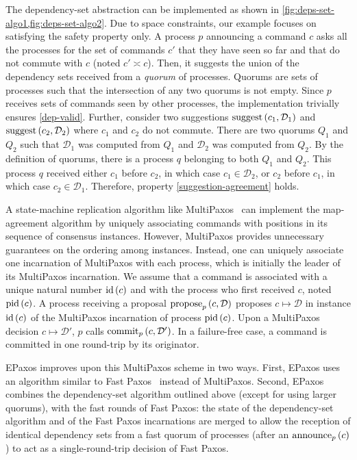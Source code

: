 The dependency-set abstraction can be implemented as shown in \cref{fig:deps-set-algo1,fig:deps-set-algo2}. Due to space constraints, our example focuses on satisfying the safety property only. A process $p$ announcing a command $c$ asks all the processes for the set of commands $c'$ that they have seen so far and that do not commute with $c$ (noted $c' \asymp c$). Then, it suggests the union of the dependency sets received from a \emph{quorum} of processes. Quorums are sets of processes such that the intersection of any two
quorums is not empty. Since $p$ receives sets of commands seen by other processes, the implementation trivially ensures \ref{dep-valid}. 
Further, consider two suggestions $\operatorname{suggest}\left(c_1,\mathcal{D}_1\right)$ and $\operatorname{suggest}\left(c_2,\mathcal{D}_2\right)$ where $c_1$ and $c_2$ do not commute. There are two quorums $Q_1$ and $Q_2$ such that $\mathcal{D}_1$ was computed from $Q_1$ and $\mathcal{D}_2$ was computed from $Q_2$. By the definition of quorums, there is a process $q$ belonging to both $Q_1$ and $Q_2$. This process $q$ received either $c_1$ before $c_2$, in which case $c_1\in
\mathcal{D}_2$, or $c_2$ before $c_1$, in which case $c_2\in\mathcal{D}_1$. Therefore, property \ref{suggestion-agreement} holds.

A state-machine replication algorithm like MultiPaxos~\cite{lamport2001paxos} can implement the map-agreement algorithm by uniquely associating commands with positions in its sequence of consensus instances. %
However, MultiPaxos provides unnecessary guarantees on the ordering among instances.
Instead, one can uniquely associate one incarnation of MultiPaxos with each process, which is initially the leader of its MultiPaxos incarnation.  
We assume that a command is associated with a unique natural number $\operatorname{id}\left( c \right)$ and with the process who first received $c$, noted $\operatorname{pid}\left( c \right)$.
A process receiving a proposal $\operatorname{propose}_p\left( c, \mathcal{D}\right) $  proposes $ c\mapsto\mathcal{D} $ in instance $\operatorname{id}\left( c \right)$ of the MultiPaxos incarnation of process $\operatorname{pid}\left( c \right)$. Upon a MultiPaxos decision $ c\mapsto\mathcal{D'} $, $p$ calls $\operatorname{commit}_p\left( c,\mathcal{D'} \right)$.
In a failure-free case, a command is committed in one round-trip by its originator.

EPaxos improves upon this MultiPaxos scheme in two ways. First, EPaxos uses an algorithm similar to Fast Paxos~\cite{Lamport05GeneralizeConsensus} instead of MultiPaxos. Second, EPaxos combines the dependency-set algorithm outlined above (except for using larger quorums), with the fast rounds of Fast Paxos: the state of the dependency-set algorithm and of the Fast Paxos incarnations are merged to allow the reception of identical dependency sets from a fast quorum of processes
(after an $\operatorname{announce}_p\left( c \right)$) to act as a single-round-trip decision of Fast Paxos. 


